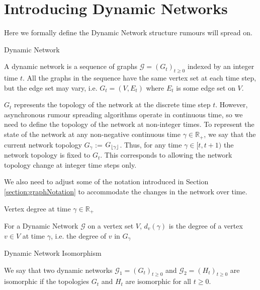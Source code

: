 \section{Introducing Dynamic Networks}

Here we formally define the Dynamic Network structure rumours will spread on.

\begin{definition}
	Dynamic Network

	\noindent
	A dynamic network is a sequence of graphs $\mathcal{G} = (G_t)_{t \geq 0}$ indexed by an integer time $t$. All the graphs in the sequence have the same vertex set at each time step, but the edge set may vary, i.e.  $G_t = (V, E_t)$ where $E_t$ is some edge set on $V$.
\end{definition}

$G_t$ represents the topology of the network at the discrete time step $t$. However, asynchronous rumour spreading algorithms operate in continuous time, so we need to define the topology of the network at non-integer times. To represent the state of the network at any non-negative continuous time $\gamma \in \mathbb{R}_+$, we say that the current network topology $G_\gamma$ := $G_{\lfloor\gamma\rfloor}$. Thus, for any time $\gamma \in [t, t + 1)$ the network topology is fixed to $G_t$. This corresponds to allowing the network topology change at integer time steps only.

We also need to adjust some of the notation introduced in Section \ref{section:graphNotation} to accommodate the changes in the network over time.

\begin{definition}
	Vertex degree at time $\gamma \in \mathbb{R}_+ $ 

	\noindent
	For a Dynamic Network $\mathcal{G}$ on a vertex set $V$, $d_v(\gamma)$ is the degree of a vertex $v \in V$ at time $\gamma$, i.e. the degree of $v$ in $G_\gamma$
\end{definition}

\begin{definition}
	Dynamic Network Isomorphism

	We say that two dynamic networks $\mathcal{G}_1 = (G_t)_{t \geq 0}$ and $\mathcal{G}_2 = (H_t)_{t \geq 0}$ are isomorphic if the topologies $G_t$ and $H_t$ are isomorphic for all $t \geq 0$. 
\end{definition}